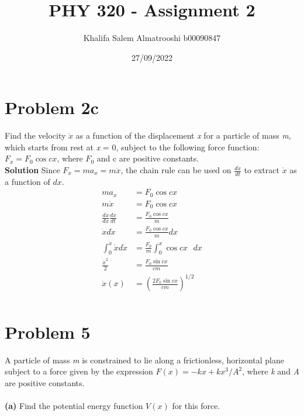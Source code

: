 \documentclass[]{article}
\title{PHY 320 - Assignment 2}
\author{Khalifa Salem Almatrooshi b00090847}
\date{27/09/2022}
\newcommand{\bd}{\textbf}
\begin{document}
	
\maketitle

\section{Problem 2c}

Find the velocity $ \dot{x} $ as a function of the displacement \textit{x} for a particle of mass \textit{m}, which starts from rest at \textit{x} = 0, subject to the following force function: $ F_x = F_0 \cos cx $, where $ F_0 $ and c are positive constants. \\

\bd{Solution} Since $ F_x = ma_x = m\ddot{x} $, the chain rule can be used on $ \frac{d\dot{x}}{dt} $ to extract $ \dot{x} $ as a function of $ dx $.
\begin{equation}
	\begin{split}
		ma_x &= F_0 \cos cx \\
		m\ddot{x} &= F_0 \cos cx \\
		\frac{d\dot{x}}{dx} \frac{dx}{dt} &= \frac{F_0 \cos cx}{m} \\
		\dot{x} d\dot{x} &= \frac{F_0 \cos cx}{m} dx \\
		\int_{0}^{\dot{x}} \dot{x} d\dot{x} &= \frac{F_0}{m} \int_{0}^{x} \cos cx \text{ } dx \\
		\frac{\dot{x}^2}{2} &=  \frac{F_0 \sin cx}{cm} \\
		\dot{x}(x) &= \left(\frac{2F_0 \sin cx}{cm}\right)^\text{1/2} \\
	\end{split}
\end{equation}

\section{Problem 5}

A particle of mass \textit{m} is constrained to lie along a frictionless, horizontal plane subject to a force given by the expression $ F(x) = -kx + kx^3 / A^2 $, where \textit{k} and \textit{A} are positive constants.
\\\\
\bd{(a)} Find the potential energy function $ V(x) $ for this force. \\
\end{document}
